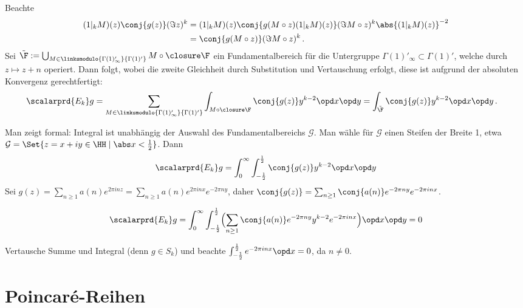 \begin{bewe}
	Beachte
	\begin{align*}
		(1|_k M)(z) \conj{g(z)}(\Im z)^k
		&= (1|_kM)(z) \conj{g(M \circ z) (1|_kM)(z)} (\Im M \circ z)^k \abs{(1|_kM)(z)}^{-2}\\
		&= \conj{g(M \circ z)} (\Im M \circ z)^k
		\,.
	\end{align*}
	Sei $\tilde\F := \bigcup_{M \in \linksmodulo{\Gamma(1)_\infty'}{\Gamma(1)'}} M \circ \closure\F$ ein Fundamentalbereich für die Untergruppe $\Gamma(1)'_\infty \subset \Gamma(1)'$, welche durch $z \mapsto z+n$ operiert.
	Dann folgt, wobei die zweite Gleichheit durch Substitution und Vertauschung erfolgt, diese ist aufgrund der absoluten Konvergenz gerechtfertigt:
	\begin{align*}
		\scalarprd{E_k}g
		&= \sum_{M \in \linksmodulo{\Gamma(1)_\infty'}{\Gamma(1)'}} \int_{M \circ \closure \F} \conj{g(z)} y^{k-2} \opd x \opd y %
		= \int_{\tilde\F} \conj{g(z)} y^{k-2} \opd x \opd y
		\,.
	\end{align*}
	
	Man zeigt formal: Integral ist unabhängig der Auswahl des Fundamentalbereichs $\mathcal G$.
	Man wähle für $\mathcal G$ einen Steifen der Breite 1, etwa $\mathcal G = \Set{z = x + iy \in \HH \mid \abs x < \frac{1}{2}}$.
	Dann
	\[
		\scalarprd{E_k}g = \int_0^\infty \int_{-\frac{1}{2}}^{\frac{1}{2}} \conj{g(z)} y^{k-2} \opd x \opd y
	\]
	Sei $g(z) = \sum_{n\geq 1} a(n) e^{2\pi inz} = \sum_{n \geq 1} a(n) e^{2\pi inx} e^{-2\pi ny}$, daher $\conj{g(z)} = \sum_{n \geq 1} \conj{a(n)} e^{-2\pi ny} e^{-2\pi inx}$.
	
	\begin{align*}
		\scalarprd {E_k}g
		= \int_0^\infty \int_{-\frac{1}{2}}^{\frac{1}{2}} \Bigl( \sum_{n\geq 1} \conj{a(n)} e^{-2\pi ny} y^{k-2} e^{-2\pi inx}\Bigr) \opd x \opd y
		= 0
	\end{align*}
	
	Vertausche Summe und Integral (denn $g \in S_k$) und beachte $\int_{-\frac{1}{2}}^{\frac{1}{2}} e^{-2\pi inx} \opd x = 0$, da $n \not= 0$.
\end{bewe}

\chapter{Poincaré-Reihen}

